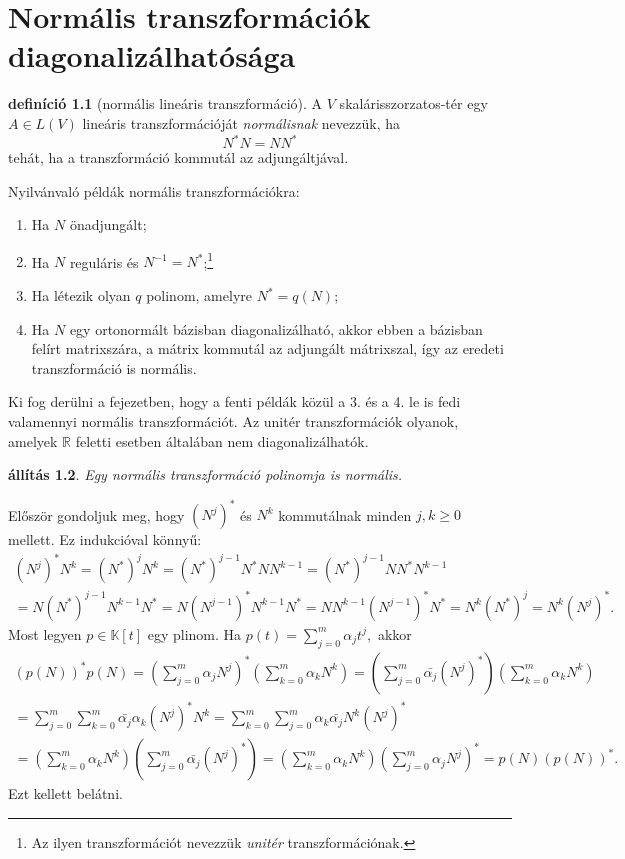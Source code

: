 \documentclass[9pt, a4paper, showtrims]{memoir}
\makeatletter
\renewenvironment{proof}[1][\proofname]
    {\par\pushQED{\qed}%
    \normalfont \topsep6\p@\@plus6\p@\relax
    \trivlist
    \item[\hskip\labelsep
        \itshape
    #1\@addpunct{:}]\ignorespaces}
    {\popQED\endtrivlist\@endpefalse}
\theoremstyle{plain}
\newtheorem{proposition}{állítás}[chapter]
\theoremstyle{remark}
\theoremstyle{definition}
\newtheorem{definition}[proposition]{definíció}
\makeatother
\begin{document}
\chapter{Normális transzformációk diagonalizálhatósága}
\begin{definition}[normális lineáris transzformáció]
	A $V$ skalárisszorzatos-tér egy $A\in L\left( V \right)$ lineáris transzformációját
	\emph{normálisnak} nevezzük,
	ha $$N^\ast N=NN^\ast$$ tehát, ha a transzformáció kommutál az adjungáltjával.
\end{definition}
Nyilvánvaló példák normális transzformációkra:
\begin{enumerate}
	\item Ha $N$ önadjungált;
	\item Ha $N$ reguláris és $N^{-1}=N^\ast$;\footnote{Az ilyen transzformációt nevezzük
		      \emph{unitér}
		      transzformációnak.}
	\item Ha létezik olyan $q$ polinom, amelyre $N^\ast=q\left( N \right)$;
	\item
	      Ha $N$ egy ortonormált bázisban diagonalizálható, akkor
	      ebben a bázisban felírt matrixszára, a mátrix kommutál az adjungált mátrixszal,
	      így az eredeti transzformáció is normális.
\end{enumerate}
Ki fog derülni a fejezetben, hogy a fenti példák közül a 3. és a 4. le is fedi valamennyi normális transzformációt.
Az unitér transzformációk olyanok, amelyek $\mathbb{R}$ feletti esetben általában nem diagonalizálhatók.
\begin{proposition}
	Egy normális transzformáció polinomja is normális.
\end{proposition}
\begin{proof}
	Először gondoljuk meg, hogy $(N^j)^\ast$ és $N^k$ kommutálnak minden $j,k≥0$ mellett.
	Ez indukcióval könnyű:
	\begin{multline*}
		(N^j)^\ast N^k
		=
		(N^\ast)^jN^k
		=
		(N^\ast)^{j-1}N^\ast NN^{k-1}
		=
		(N^\ast)^{j-1}NN^\ast N^{k-1}
		\\
		=
		N(N^\ast)^{j-1}N^{k-1}N^\ast
		=
		N(N^{j-1})^\ast N^{k-1}N^\ast
		=
		NN^{k-1}(N^{j-1})^\ast N^\ast
		=
		N^k(N^\ast)^j
		=
		N^k(N^j)^\ast.
	\end{multline*}
	Most legyen $p\in \mathbb{K}[t]$ egy plinom.
	Ha $p\left( t \right)=\sum_{j=0}^m\alpha_jt^j,$
	akkor
	\begin{multline*}
		\left( p\left( N \right) \right)^\ast p\left( N \right)
		=
		\left( \sum_{j=0}^m\alpha_jN^j \right)^\ast
		\left( \sum_{k=0}^m\alpha_kN^k \right)
		=
		\left( \sum_{j=0}^m\bar{\alpha_j}(N^j)^\ast \right)
		\left( \sum_{k=0}^m\alpha_kN^k \right)
		\\
		=
		\sum_{j=0}^m\sum_{k=0}^m\bar{\alpha_j}\alpha_k(N^j)^\ast N^k
		=
		\sum_{k=0}^m\sum_{j=0}^m\alpha_k\bar{\alpha_j}N^k(N^j)^\ast
		\\
		=
		\left( \sum_{k=0}^m\alpha_kN^k \right)
		\left( \sum_{j=0}^m\bar{\alpha_j}(N^j)^\ast \right)
		=
		\left( \sum_{k=0}^m\alpha_kN^k \right)
		\left( \sum_{j=0}^m\alpha_jN^j\right)^\ast
		=
		p\left( N \right)\left( p\left( N \right) \right)^\ast.
	\end{multline*}
	Ezt kellett belátni.
\end{proof}
\end{document}
